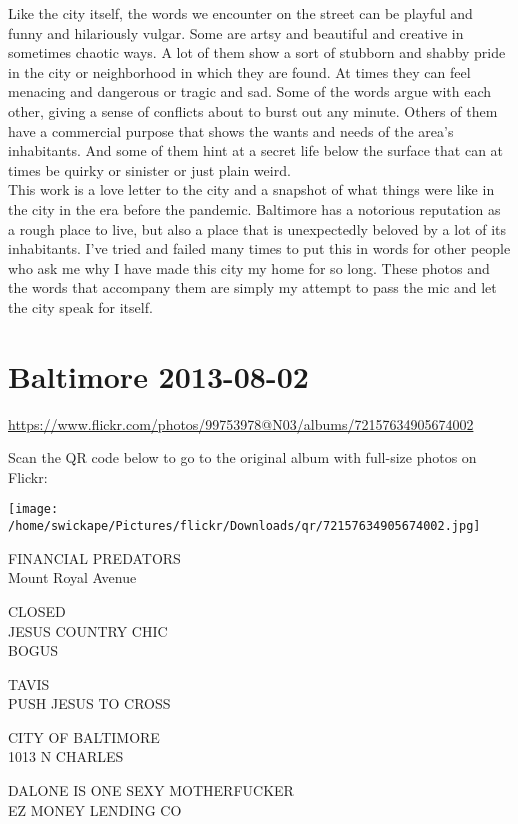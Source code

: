 \documentclass[10pt,letterpaper]{article}
\begin{document}
Like the city itself, the words we encounter on the street can be playful and funny and hilariously vulgar.  Some are artsy and beautiful and creative in sometimes chaotic ways.  A lot of them show a sort of stubborn and shabby pride in the city or neighborhood in which they are found.  At times they can feel menacing and dangerous or tragic and sad.  Some of the words argue with each other, giving a sense of conflicts about to burst out any minute.  Others of them have a commercial purpose that shows the wants and needs of the area's inhabitants.  And some of them hint at a secret life below the surface that can at times be quirky or sinister or just plain weird.\\


This work is a love letter to the city and a snapshot of what things were like in the city in the era before the pandemic.  Baltimore has a notorious reputation as a rough place to live, but also a place that is unexpectedly beloved by a lot of its inhabitants.  I've tried and failed many times to put this in words for other people who ask me why I have made this city my home for so long.  These photos and the words that accompany them are simply my attempt to pass the mic and let the city speak for itself.

\pagebreak

\mbox{}

\pagebreak


\section*{Baltimore 2013-08-02}

\url{https://www.flickr.com/photos/99753978@N03/albums/72157634905674002}

Scan the QR code below to go to the original album with full-size photos on Flickr:

\texttt{[image: /home/swickape/Pictures/flickr/Downloads/qr/72157634905674002.jpg]}


FINANCIAL PREDATORS\\
Mount Royal Avenue

CLOSED\\
JESUS COUNTRY CHIC\\
BOGUS

TAVIS\\
PUSH JESUS TO CROSS

CITY OF BALTIMORE\\
1013 N CHARLES

DALONE IS ONE SEXY MOTHERFUCKER\\
EZ MONEY LENDING CO
\end{document}
